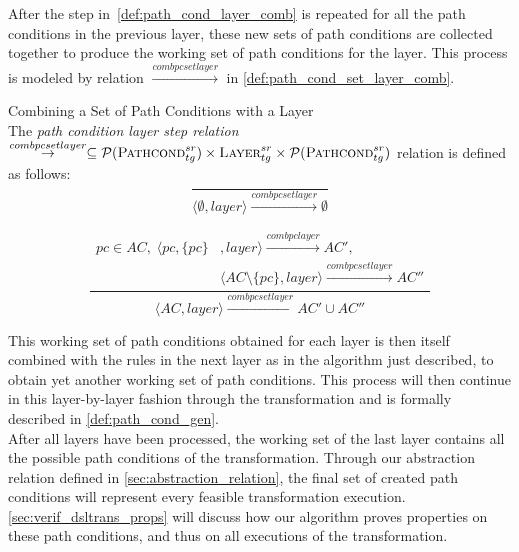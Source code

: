 After the step in~\cref{def:path_cond_layer_comb} is repeated for all the path conditions in the previous layer, these new sets of path conditions are collected together to produce the working set of path conditions for the layer. This process is modeled by relation $\stackrel{combpcsetlayer}{\rightarrow}$ in \cref{def:path_cond_set_layer_comb}.

\begin{definition} {Combining a Set of Path Conditions with a Layer\\}
\label{def:path_cond_set_layer_comb}
The \emph{path condition layer step relation}
$\stackrel{combpcsetlayer}{\rightarrow}\subseteq \\\mathcal{P}(\textsc{Pathcond}^{sr}_{tg}) \times \textsc{Layer}^{sr}_{tg}\times
\mathcal{P}(\textsc{Pathcond}^{sr}_{tg})$ relation is defined as follows:
$$\frac{}
{\langle \emptyset,layer\rangle \xrightarrow{combpcsetlayer} \emptyset}$$

$$\frac{\begin{array}{ll}pc\in AC,\;\langle pc,\{pc\}&,layer\rangle\xrightarrow{combpclayer}AC',\\ &\langle AC\setminus\{pc\},layer\rangle\xrightarrow{combpcsetlayer}AC''
\end{array}}
{\langle AC,layer\rangle \xrightarrow{combpcsetlayer} AC'\cup AC''}$$
\end{definition}

This working set of path conditions obtained for each layer is then itself combined with the rules in the next layer as in the algorithm just described, to obtain yet another working set of path conditions. This process will then continue in this layer-by-layer fashion through the transformation and is formally described in \cref{def:path_cond_gen}.\\
After all layers have been processed, the working set of the last layer contains all the  possible path conditions of the transformation. Through our abstraction relation defined in \cref{sec:abstraction_relation}, the final set of created path conditions will represent every feasible transformation execution. \cref{sec:verif_dsltrans_props} will discuss how our algorithm proves properties on these path conditions, and thus on all executions of the transformation.

